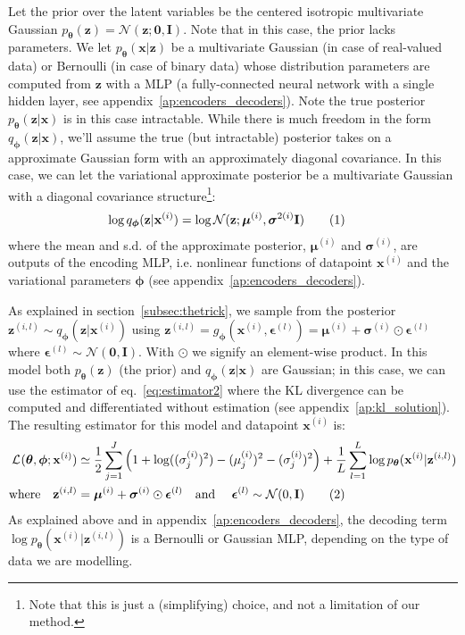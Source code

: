 \documentclass{article} %
\theoremstyle{definition}
\newcommand{\bb}[1]{\mathbf{#1}}
\newcommand{\bx}{\bb{x}}
\newcommand{\bxi}{\bx^{(i)}}
\newcommand{\bz}{\bb{z}}
\newcommand{\bzil}{\bz^{(i,l)}}
\newcommand{\bT}{\boldsymbol{\theta}}
\newcommand{\bphi}{\boldsymbol{\phi}}
\newcommand{\beps}{\boldsymbol{\epsilon}}
\newcommand{\bepsl}{\beps^{(l)}}
\newcommand{\bsigma}{\boldsymbol{\sigma}}
\newcommand{\bmu}{\boldsymbol{\mu}}
\newcommand{\bzero}{\bb{0}}
\newcommand{\bI}{\bb{I}}
\newcommand{\pT}{p_{\bT}}
\newcommand{\qPhi}{q_{\bphi}}
\newcommand{\gPhi}{g_{\bphi}}
\newcommand{\eqnr}{\addtocounter{equation}{1}\tag{\theequation}}
\theoremstyle{definition}
\newcommand{\LB}[2]{\mathcal{L}^{#1}(\bT,\bphi; #2)}
\begin{document}
Let the prior over the latent variables be the centered isotropic multivariate Gaussian $\pT(\bz) = \mathcal{N}(\bz; \bzero, \bI)$. Note that in this case, the prior lacks parameters. We let $\pT(\bx|\bz)$ be a multivariate Gaussian (in case of real-valued data) or Bernoulli (in case of binary data) whose distribution parameters are computed from $\bz$ with a MLP (a fully-connected neural network with a single hidden layer, see appendix~\ref{ap:encoders_decoders}). Note the true posterior $\pT(\bz|\bx)$ is in this case intractable.
While there is much freedom in the form $\qPhi(\bz|\bx)$, we'll assume the true (but intractable) posterior takes on a approximate Gaussian form with an approximately diagonal covariance. In this case, we can let the variational approximate posterior be a multivariate Gaussian with a diagonal covariance structure\footnote{Note that this is just a (simplifying) choice, and not a limitation of our method.}:
\begin{align*}
\log \qPhi(\bz|\bxi)
&= \log \mathcal{N}(\bz; \bmu^{(i)}, \bsigma^{2 (i)} \bI)
\eqnr\end{align*}
where the mean and s.d. of the approximate posterior, $\bmu^{(i)}$ and $\bsigma^{(i)}$, are outputs of the encoding MLP, i.e. nonlinear functions of datapoint $\bx^{(i)}$ and the variational parameters $\bphi$ (see appendix~\ref{ap:encoders_decoders}).

As explained in section~\ref{subsec:thetrick}, we sample from the posterior $\bzil \sim \qPhi(\bz|\bxi)$ using $\bzil = \gPhi(\bxi, \bepsl) = \bmu^{(i)} + \bsigma^{(i)} \odot \bepsl$ where $\bepsl \sim \mathcal{N}(\bzero,\bI)$. With $\odot$ we signify an element-wise product.
In this model both $\pT(\bz)$ (the prior) and $\qPhi(\bz|\bx)$ are Gaussian; in this case, we can use the estimator of eq.~\eqref{eq:estimator2} where the KL divergence can be computed and differentiated without estimation (see appendix~\ref{ap:kl_solution}). The resulting estimator for this model and datapoint $\bxi$ is:
\begin{align*}
\LB{}{\bxi}
&\simeq 
\frac{1}{2} \sum_{j=1}^J \left(1 + \log ((\sigma_j^{(i)})^2) - (\mu_j^{(i)})^2 - (\sigma_j^{(i)})^2 \right)
+ \frac{1}{L} \sum_{l=1}^L \log \pT(\bxi|\bzil) \\
\text{where\quad}
\bzil &= \bmu^{(i)} + \bsigma^{(i)} \odot \beps^{(l)}
\text{\quad and \quad}
\bepsl \sim \mathcal{N}(0,\bI)
\label{eq:gaussian_estimator}\eqnr\end{align*}
As explained above and in appendix~\ref{ap:encoders_decoders}, the decoding term $\log \pT(\bxi|\bzil)$ is a Bernoulli or Gaussian MLP, depending on the type of data we are modelling.
\end{document}
